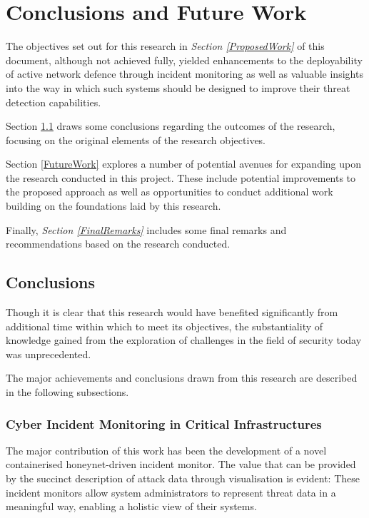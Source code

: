 \chapter{Conclusions and Future Work} \label{Chapter7}
The objectives set out for this research in \textit{Section \ref{ProposedWork}} of this document, although not achieved fully, yielded enhancements to the deployability of active network defence through incident monitoring as well as valuable insights into the way in which such systems should be designed to improve their threat detection capabilities.

Section \ref{ConclusionsSection} draws some conclusions regarding the outcomes of the research, focusing on the original elements of the research objectives.

Section \ref{FutureWork} explores a number of potential avenues for expanding upon the research conducted in this project. These include potential improvements to the proposed approach as well as opportunities to conduct additional work building on the foundations laid by this research.

Finally, \textit{Section \ref{FinalRemarks}} includes some final remarks and recommendations based on the research conducted.

%
% 
\section{Conclusions} \label{ConclusionsSection}
Though it is clear that this research would have benefited significantly from additional time within which to meet its objectives, the substantiality of knowledge gained from the exploration of challenges in the field of security today was unprecedented.

The major achievements and conclusions drawn from this research are described in the following subsections.

\subsection{Cyber Incident Monitoring in Critical Infrastructures}
The major contribution of this work has been the development of a novel containerised honeynet-driven incident monitor. The value that can be provided by the succinct description of attack data through visualisation is evident: These incident monitors allow system administrators to represent threat data in a meaningful way, enabling a holistic view of their systems.

